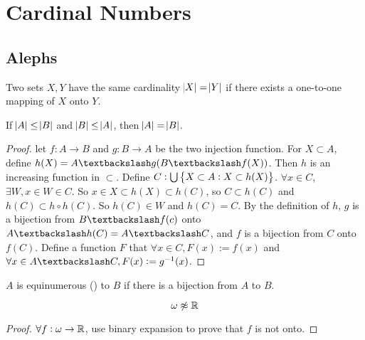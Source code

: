 \section{Cardinal Numbers}

\subsection{Alephs}

\begin{definition}
    Two sets $X,Y$ have the same cardinality $\abs{X} = \abs{Y}$ if there exists a one-to-one mapping of $X$ onto $Y$.
\end{definition}

\begin{theorem}
    If $\abs{A} \leq \abs{B}$ and $\abs{B} \leq \abs{A}$, then $\abs{A} = \abs{B}$.
\end{theorem}
\begin{proof}
    let $f: A \rightarrow B$ and $g : B \rightarrow A$ be the two injection function. For $X \subset A$, define $h(X) = A \textbackslash g (B \textbackslash f(X)) $. Then $h$ is an increasing function in $\subset$. Define $C: \bigcup \set{X\subset A: X \subset h(X)}$. $\forall x \in C$, $\exists W, x \in W \in C$. So $x \in X \subset{h(X)} \subset h(C)$, so $C \subset h(C)$ and $h(C) \subset h \circ h (C)$. So $h(C) \in W$ and $h(C) = C$. By the definition of $h$, $g$ is a bijection from $B \textbackslash f(c)$ onto $A \textbackslash h(C) = A \textbackslash C$, and $f$ is a bijection from $C$ onto $f(C)$. Define a function $F$ that $\forall x \in C, F(x) := f(x)$ and $\forall x \in A \textbackslash C, F(x) := g^{-1}(x)$.
\end{proof}


\begin{definition}
    $A$ is equinumerous (\cindex{$\approx$}) to $B$ if there is a bijection from $A$ to $B$.
\end{definition}

\begin{theorem}
    \begin{equation}
        \omega \not\approx \mathbb{R}
    \end{equation}
\end{theorem}
\begin{proof}
    $\forall f:\omega \rightarrow \mathbb{R}$, use binary expansion to prove that $f$ is not onto.
\end{proof}


